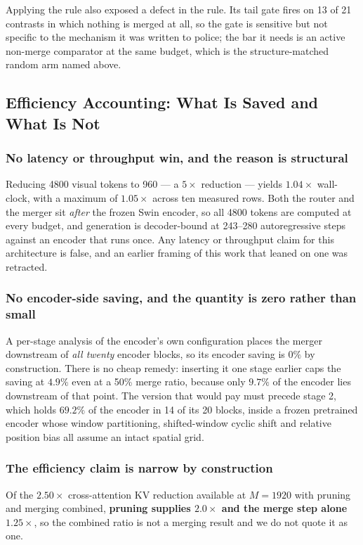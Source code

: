\documentclass[conference]{IEEEtran}
\begin{document}
Applying the rule also exposed a defect in the rule. Its tail gate fires on 13 of 21
contrasts in which nothing is merged at all, so the gate is sensitive but not specific to the
mechanism it was written to police; the bar it needs is an active non-merge comparator at the
same budget, which is the structure-matched random arm named above.

\subsection{Efficiency Accounting: What Is Saved and What Is Not}
\label{sec:efficiency}

\subsubsection{No latency or throughput win, and the reason is structural}
Reducing 4800 visual tokens to 960 --- a $5\times$ reduction --- yields $\bm{1.04\times}$
wall-clock, with a maximum of $1.05\times$ across ten measured rows. Both the router and the
merger sit \emph{after} the frozen Swin encoder, so all 4800 tokens are computed at every
budget, and generation is decoder-bound at 243--280 autoregressive steps against an encoder
that runs once. Any latency or throughput claim for this architecture is false, and an
earlier framing of this work that leaned on one was retracted.

\subsubsection{No encoder-side saving, and the quantity is zero rather than small}
A per-stage analysis of the encoder's own configuration places the merger downstream of
\emph{all twenty} encoder blocks, so its encoder saving is $0\%$ by construction. There is no
cheap remedy: inserting it one stage earlier caps the saving at $4.9\%$ even at a 50\% merge
ratio, because only $9.7\%$ of the encoder lies downstream of that point. The version that
would pay must precede stage 2, which holds $69.2\%$ of the encoder in 14 of its 20 blocks,
inside a frozen pretrained encoder whose window partitioning, shifted-window cyclic shift and
relative position bias all assume an intact spatial grid.

\subsubsection{The efficiency claim is narrow by construction}
Of the $2.50\times$ cross-attention KV reduction available at $M = 1920$ with pruning and
merging combined, \textbf{pruning supplies $2.0\times$ and the merge step alone
$1.25\times$}, so the combined ratio is not a merging result and we do not quote it as one.
\end{document}
